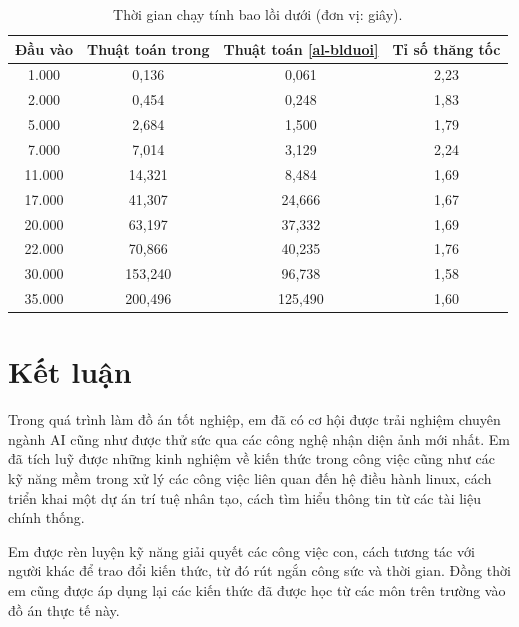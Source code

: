 \documentclass[12pt,a4paper,openany,oneside]{report}
\begin{document}
{\fontsize{12pt}{12pt}\selectfont \baselineskip 0.65cm
	\renewcommand{\baselinestretch}{1}
	\begin{table}[ht!]
		\begin{center}
			\caption{Thời gian chạy tính bao lồi dưới (đơn vị: giây).}
			\label{tab:51}
			\begin{tabular}{cccc}
				\hline
				{Đầu vào} &{Thuật toán trong} \cite{An-Giang} & {Thuật toán} \ref{al-blduoi}& Tỉ số thăng tốc\\
				\hline
				1.000 & 0,136& 0,061&2,23\\ 
				2.000 & 0,454& 0,248 &1,83\\  
				5.000 & 2,684& 1,500 &1,79\\  
				7.000 & 7,014& 3,129 &2,24\\ 
				11.000  & 14,321& 8,484 &1,69\\ 
				17.000  & 41,307& 24,666 &1,67\\ 
				20.000 & 63,197& 37,332 &1,69\\  
				22.000 & 70,866& 40,235 & 1,76\\ 
				30.000 & 153,240& 96,738 &1,58\\ 
				35.000& 200,496& 125,490& 1,60\\ \hline	
			\end{tabular}	
		\end{center}
	\end{table}	
}







\chapter*{{Kết luận}}

Trong quá trình làm đồ án tốt nghiệp, em đã có cơ hội được trải nghiệm chuyên ngành AI cũng như được thử sức qua các công nghệ nhận diện ảnh mới nhất. Em đã tích luỹ được những kinh nghiệm về kiến thức trong công việc cũng như các kỹ năng mềm trong xử lý các công việc liên quan đến hệ điều hành linux, cách triển khai một dự án trí tuệ nhân tạo, cách tìm hiểu thông tin từ các tài liệu chính thống.
 
Em được rèn luyện kỹ năng giải quyết các công việc con, cách tương tác với người khác để trao đổi kiến thức, từ đó rút ngắn công sức và thời gian. Đồng thời em cũng được áp dụng lại các kiến thức đã được học từ các môn trên trường vào đồ án thực tế này.
\end{document}

